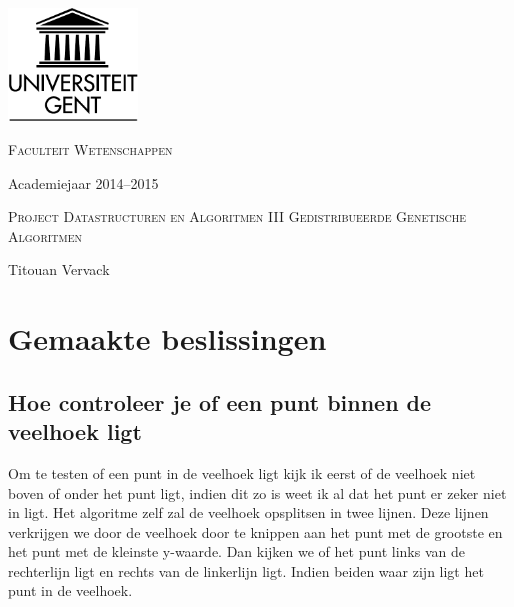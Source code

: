 \documentclass[a4paper]{article}
\begin{document}
\begin{titlepage}
\fontsize{12pt}{14pt}\selectfont

\begin{center}

\includegraphics[height=3cm]{ruglogo}

\vspace{1cm}

\fontsize{14pt}{17pt}\selectfont
\textsc{Faculteit Wetenschappen}
\fontsize{12pt}{14pt}\selectfont
\vspace{0.3cm}

\vspace{1.2cm}

Academiejaar 2014--2015

\vspace{2.8cm}

\fontsize{17.28pt}{21pt}\selectfont

\textsc{Project Datastructuren en Algoritmen III}
\fontsize{14.28pt}{21pt}\selectfont
\textsc{Gedistribueerde Genetische Algoritmen}

\fontsize{12pt}{14pt}\selectfont

\vspace{2.8cm}

Titouan Vervack

\end{center}
\end{titlepage}
\newpage
\fontsize{12pt}{16pt}\selectfont

\section{Gemaakte beslissingen}
\subsection{Hoe controleer je of een punt binnen de veelhoek ligt}
Om te testen of een punt in de veelhoek ligt kijk ik eerst of de veelhoek niet boven of onder het punt ligt, indien dit zo is weet ik al dat het punt er zeker niet in ligt.
Het algoritme zelf zal de veelhoek opsplitsen in twee lijnen. Deze lijnen verkrijgen we door de veelhoek door te knippen aan het punt met de grootste en het punt met de kleinste y-waarde. Dan kijken we of het punt links van de rechterlijn ligt en rechts van de linkerlijn ligt. Indien beiden waar zijn ligt het punt in de veelhoek.
\end{document}
